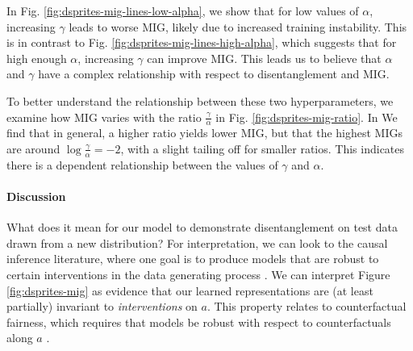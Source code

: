 In Fig. \ref{fig:dsprites-mig-lines-low-alpha}, we show that for low values of $\alpha$, increasing $\gamma$ leads to worse MIG, likely due to increased training instability.
This is in contrast to Fig. \ref{fig:dsprites-mig-lines-high-alpha}, which suggests that for high enough $\alpha$, increasing $\gamma$ can improve MIG.
This leads us to believe that $\alpha$ and $\gamma$ have a complex relationship with respect to disentanglement and MIG.

To better understand the relationship between these two hyperparameters, we examine how MIG varies with the ratio $\frac{\gamma}{\alpha}$ in Fig. \ref{fig:dsprites-mig-ratio}.
In We find that in general, a higher ratio yields lower MIG, but that the highest MIGs are around $\log\frac{\gamma}{\alpha} = -2$, with a slight tailing off for smaller ratios.
This indicates there is a dependent relationship between the values of $\gamma$ and $\alpha$.

\paragraph{Discussion}
What does it mean for our model to demonstrate disentanglement on test data drawn from a new distribution?
For interpretation, we can look to the causal inference literature, where one goal is to produce models that are robust to certain interventions in the data generating process \citep{rothlenhauser2018anchor}.
We can interpret Figure \ref{fig:dsprites-mig} as evidence that our learned representations are (at least partially) invariant to \textit{interventions} on $a$.
This property relates to counterfactual fairness, which requires that models be robust with respect to counterfactuals along $a$ \citep{kusner2017counterfactual}.

